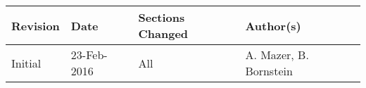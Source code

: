 %
%

\section*{}

\renewcommand{\arraystretch}{1.5}
\begin{table}[htp]
    \begin{center}
        \begin{tabular}{|p{2cm}|p{2.5cm}|p{6cm}|p{4cm}|}
            \hline
            \textbf{Revision} & \textbf{Date} & \textbf{Sections Changed} & \textbf{Author(s)} \\
            \hline\hline
            Initial & 23-Feb-2016 & All & A. Mazer, B. Bornstein \\
            \hline
        \end{tabular}
    \end{center}
\end{table}
